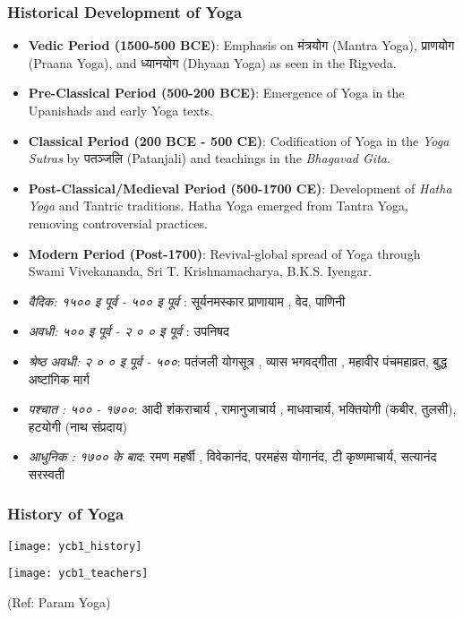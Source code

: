 \begin{frame}[fragile]\frametitle{Historical Development of Yoga}

      \begin{itemize}
		\item \textbf{Vedic Period (1500-500 BCE)}: Emphasis on मंत्रयोग (Mantra Yoga), प्राणयोग (Praana Yoga), and ध्यानयोग (Dhyaan Yoga) as seen in the Rigveda.
		\item \textbf{Pre-Classical Period (500-200 BCE)}: Emergence of Yoga in the Upanishads and early Yoga texts.
		\item \textbf{Classical Period (200 BCE - 500 CE)}: Codification of Yoga in the \textit{Yoga Sutras} by पतञ्जलि (Patanjali) and teachings in the \textit{Bhagavad Gita}.
		\item \textbf{Post-Classical/Medieval Period (500-1700 CE)}: Development of \textit{Hatha Yoga} and Tantric traditions. Hatha Yoga emerged from Tantra Yoga, removing controversial practices.
		\item \textbf{Modern Period (Post-1700)}: Revival-global spread of Yoga through Swami Vivekananda, Sri T. Krishnamacharya, B.K.S. Iyengar.

		\item \textit{वैदिक: १५०० इ पूर्व - ५०० इ पूर्व }: सूर्यनमस्कार प्राणायाम , वेद, पाणिनी 
		\item \textit{अवधी: ५०० इ पूर्व -  २ ० ०  इ पूर्व }: उपनिषद
		\item \textit{श्रेष्ठ अवधी:  २ ० ०  इ पूर्व - ५००}: पतंजली  योगसूत्र , व्यास भगवद्गीता , महावीर पंचमहाव्रत, बुद्ध अष्टांगिक मार्ग 
		\item \textit{पश्चात : ५०० - १७००}: आदी शंकराचार्य , रामानुजाचार्य , माधवाचार्य, भक्तियोगी (कबीर, तुलसी), हटयोगी (नाथ संप्रदाय)
		\item \textit{आधुनिक : १७०० के बाद}: रमण महर्षी , विवेकानंद, परमहंस योगानंद, टी कृष्णमाचार्य, सत्यानंद सरस्वती 
		
	  \end{itemize}

\end{frame}

\begin{frame}[fragile]\frametitle{History of Yoga}
      \begin{center}
        \texttt{[image: ycb1\_history]}

        \texttt{[image: ycb1\_teachers]}

		{\tiny (Ref: Param Yoga)}		
        \end{center}

\end{frame}


